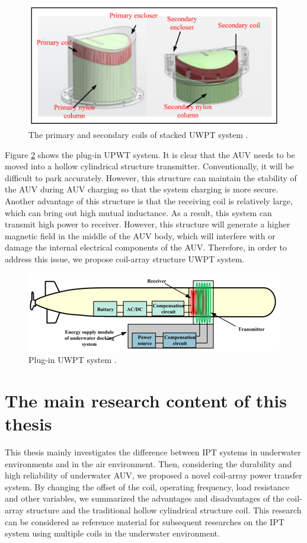 \begin{figure}[!b]
    \centering
    \includegraphics[width=0.7\linewidth]{images/1_stacked_UWPT_system_details.png}
    \caption{The primary and secondary coils of stacked UWPT system \cite{Song}.}
    \label{fig:stacked UWPT system detail}
\end{figure}

Figure \ref{fig:plug in UWPT system} shows the plug-in UPWT system. 
It is clear that the AUV needs to be moved into a hollow cylindrical structure transmitter.
Conventionally, it will be difficult to park accurately. 
However, this structure can maintain the stability of the AUV during AUV charging so that the system charging is more secure. 
Another advantage of this structure is that the receiving coil is relatively large, which can bring out high mutual inductance. 
As a result, this system can transmit high power to receiver.
However, this structure will generate a higher magnetic field in the middle of the AUV body, which will interfere with or damage the internal electrical components of the AUV.
Therefore, in order to address this issue, we propose coil-array structure UWPT system.
\begin{figure}[!t]
    \centering
    \includegraphics[width=0.7\linewidth]{images/1_plugin_UWPT_system.png}
    \caption{Plug-in UWPT system \cite{Wang2019}.}
    \label{fig:plug in UWPT system}
\end{figure}


\section{The main research content of this thesis}
This thesis mainly investigates the difference between IPT systems in underwater environments and in the air environment. 
Then, considering the durability and high reliability of underwater AUV, we proposed a novel coil-array power transfer system. 
By changing the offset of the coil, operating frequency, load resistance and other variables, we summarized the advantages and disadvantages of the coil-array structure and the traditional hollow cylindrical structure coil.
This research can be considered as reference material for subsequent researches on the IPT system using multiple coils in the underwater environment.

